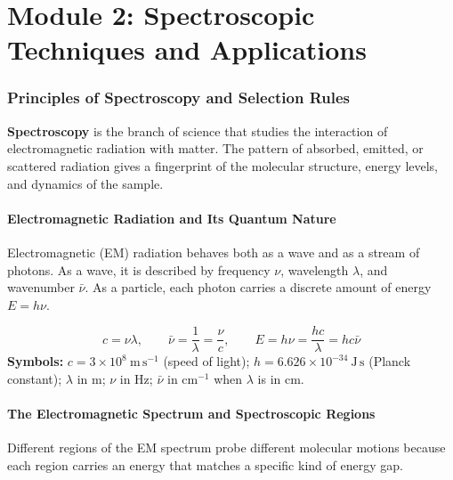 \documentclass[12pt,a4paper]{article}
\newcommand{\moduletitle}{Combined Notes}
\begin{document}
\newpage
{}    %
\setcounter{page}{1}

\renewcommand{\moduletitle}{Module 2 --- Spectroscopic Techniques}
\part{Module 2: Spectroscopic Techniques and Applications}
\setcounter{section}{0}

\section{Principles of Spectroscopy and Selection Rules}

\begin{tcolorbox}[defbox]
\textbf{Spectroscopy} is the branch of science that studies the interaction of electromagnetic radiation with matter. The pattern of absorbed, emitted, or scattered radiation gives a fingerprint of the molecular structure, energy levels, and dynamics of the sample.
\end{tcolorbox}

\subsection{Electromagnetic Radiation and Its Quantum Nature}
Electromagnetic (EM) radiation behaves both as a wave and as a stream of photons. As a wave, it is described by frequency $\nu$, wavelength $\lambda$, and wavenumber $\bar{\nu}$. As a particle, each photon carries a discrete amount of energy $E=h\nu$.

\begin{tcolorbox}[formulabox, title={Wave--Particle Relations}]
\[
c = \nu\lambda, \qquad \bar{\nu}=\frac{1}{\lambda}=\frac{\nu}{c}, \qquad E=h\nu=\frac{hc}{\lambda}=hc\bar{\nu}
\]
\textbf{Symbols:} $c=3\times10^{8}\ \mathrm{m\,s^{-1}}$ (speed of light); $h=6.626\times10^{-34}\ \mathrm{J\,s}$ (Planck constant); $\lambda$ in m; $\nu$ in Hz; $\bar{\nu}$ in $\mathrm{cm^{-1}}$ when $\lambda$ is in cm.
\end{tcolorbox}

\subsection{The Electromagnetic Spectrum and Spectroscopic Regions}
Different regions of the EM spectrum probe different molecular motions because each region carries an energy that matches a specific kind of energy gap.
\end{document}
